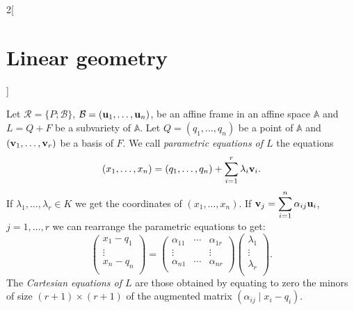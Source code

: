 \documentclass[../../../main.tex]{subfiles}
\begin{document}
\begin{multicols}{2}[\section{Linear geometry}]
\begin{definition}
  \end{definition}
  \begin{definition}
    Let $\mathcal{R}=\{P;\mathcal{B}\}$, $\mathcal{B}=(\boldsymbol{\mathrm{u}}_1,\ldots,\boldsymbol{\mathrm{u}}_n)$, be an affine frame in an affine space $\mathbb{A}$ and $L=Q+F$ be a subvariety of $\mathbb{A}$. Let $Q=(q_1,\ldots,q_n)$ be a point of $\mathbb{A}$ and $(\boldsymbol{\mathrm{v}}_1,\ldots,\boldsymbol{\mathrm{v}}_r)$ be a basis of $F$. We call \textit{parametric equations of $L$} the equations $$(x_1,\ldots,x_n)=(q_1,\ldots,q_n)+\sum_{i=1}^r\lambda_i\boldsymbol{\mathrm{v}}_i.$$ If $\lambda_1,\ldots,\lambda_r\in K$ we get the coordinates of $(x_1,\ldots,x_n)$. If $\displaystyle \boldsymbol{\mathrm{v}}_j=\sum_{i=1}^n\alpha_{ij}\boldsymbol{\mathrm{u}}_i$, $j=1,\ldots,r$ we can rearrange the parametric equations to get: $$\begin{pmatrix}
        x_1-q_1 \\
        \vdots  \\
        x_n-q_n \\
      \end{pmatrix}=\begin{pmatrix}
        \alpha_{11} & \cdots & \alpha_{1r} \\
        \vdots      &        & \vdots      \\
        \alpha_{n1} & \cdots & \alpha_{nr} \\
      \end{pmatrix}\begin{pmatrix}
        \lambda_1 \\
        \vdots    \\
        \lambda_r \\
      \end{pmatrix}.$$ The \textit{Cartesian equations of $L$} are those obtained by equating to zero the minors of size $(r+1)\times(r+1)$ of the augmented matrix $\left(\alpha_{ij}\mid x_i-q_i\right)$.
  \end{definition}

\end{multicols}
\end{document}
